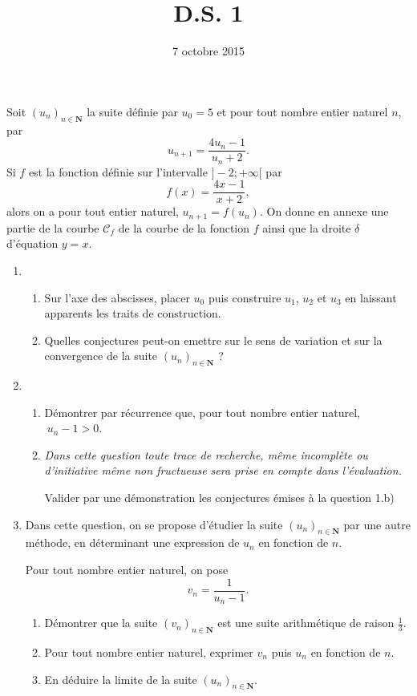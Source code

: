 \documentclass[a4paper,12pt,french]{article}
\title{D.S. 1}
\date{7 octobre 2015}
\newcommand{\N}{\mathbf{N}}
\begin{document}
\maketitle

\begin{Exercise}[number=1]
  Soit $(u_n)_{n\in\N}$ la suite définie par $u_0 = 5$ et pour tout
  nombre entier naturel $n$, par \[u_{n+1} = \frac{4u_n - 1}{u_n+2}.\]
  Si $f$ est la fonction définie sur l'intervalle $]-2;+\infty[$ par \[
  f(x) = \frac{4x -1}{x+2}, \] alors on a pour tout entier naturel,
  $u_{n+1} = f(u_n)$. On donne en annexe une partie de la courbe
  $\mathcal{C}_f$ de la courbe de la fonction $f$ ainsi que la droite
  $\delta$ d'équation $y=x$.

  \begin{enumerate}
    \item \begin{enumerate}
        \item Sur l'axe des abscisses, placer $u_0$ puis construire
          $u_1$, $u_2$ et $u_3$ en laissant apparents les traits de
          construction.
        \item Quelles conjectures peut-on emettre sur le sens de
          variation et sur la convergence de la suite $(u_n)_{n\in\N}$ ?
      \end{enumerate}
    \item \begin{enumerate}
        \item Démontrer par récurrence que, pour tout nombre entier
          naturel, $\ u_n -1 > 0$.

        \item \emph{Dans cette question toute trace de recherche, même
            incomplète ou d'initiative même non fructueuse sera prise en
          compte dans l'évaluation.}

          Valider par une démonstration les conjectures émises à la
          question 1.b)
      \end{enumerate}
    \item Dans cette question, on se propose d'étudier la suite
      $(u_n)_{n\in\N}$ par une autre méthode, en déterminant une
      expression de $u_n$ en fonction de $n$.

      Pour tout nombre entier naturel, on pose \[ v_n = \frac1{u_n -1}.
      \]
      \begin{enumerate}
        \item Démontrer que la suite $(v_n)_{n\in\N}$ est une suite
          arithmétique de raison $\frac13$.

        \item Pour tout nombre entier naturel, exprimer $v_n$ puis $u_n$
          en fonction de $n$.

        \item En déduire la limite de la suite $(u_n)_{n\in\N}$.
      \end{enumerate}
  \end{enumerate}

\end{Exercise}
\end{document}

